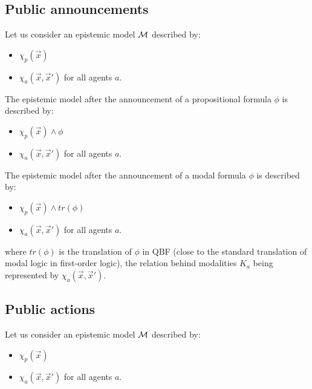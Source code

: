 \documentclass{article}
\begin{document}
\subsection{Public announcements}



Let us consider an epistemic model $\mathcal M$ described by:
\begin{itemize}
	\item  $\chi_p(\vec x)$ 
	\item $\chi_a(\vec x, \vec x')$ for all agents $a$.
\end{itemize}


The epistemic model after the announcement of a propositional formula $\phi$ is described by:
\begin{itemize}
	\item  $\chi_p(\vec x) \land \phi$ 
	\item $\chi_a(\vec x, \vec x')$ for all agents $a$.
\end{itemize}


The epistemic model after the announcement of a modal formula $\phi$ is described by:
\begin{itemize}
	\item  $\chi_p(\vec x) \land tr(\phi)$ 
	\item $\chi_a(\vec x, \vec x')$ for all agents $a$.
\end{itemize}

where $tr(\phi)$ is the translation of $\phi$ in QBF (close to the standard translation of modal logic in first-order logic), the relation behind modalities $K_a$ being represented by $\chi_a(\vec x, \vec x')$.












\subsection{Public actions}

Let us consider an epistemic model $\mathcal M$ described by:
\begin{itemize}
	\item  $\chi_p(\vec x)$ 
	\item $\chi_a(\vec x, \vec x')$ for all agents $a$.
\end{itemize}
\end{document}

